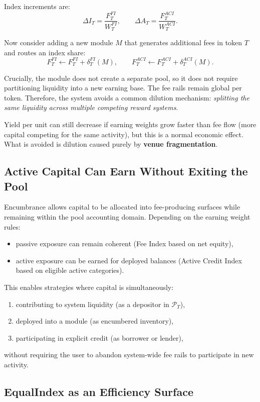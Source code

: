 \documentclass[version=preprint]{iacrcc}
\begin{document}
Index increments are:
\[
\Delta I_T = \frac{F^{FI}_T}{W^{FI}_T},
\qquad
\Delta A_T = \frac{F^{ACI}_T}{W^{ACI}_T}.
\]

Now consider adding a new module $M$ that generates additional fees in token $T$ and routes an index share:
\[
F^{FI}_T \leftarrow F^{FI}_T + \delta^{FI}_T(M),
\qquad
F^{ACI}_T \leftarrow F^{ACI}_T + \delta^{ACI}_T(M).
\]

Crucially, the module does not create a separate pool, so it does not require partitioning liquidity into a new earning base. The fee rails remain global per token. Therefore, the system avoids a common dilution mechanism: \textit{splitting the same liquidity across multiple competing reward systems}.

Yield per unit can still decrease if earning weights grow faster than fee flow (more capital competing for the same activity), but this is a normal economic effect. What is avoided is dilution caused purely by \textbf{venue fragmentation}.

\subsection{Active Capital Can Earn Without Exiting the Pool}

Encumbrance allows capital to be allocated into fee-producing surfaces while remaining within the pool accounting domain. Depending on the earning weight rules:
\begin{itemize}
  \item passive exposure can remain coherent (Fee Index based on net equity),
  \item active exposure can be earned for deployed balances (Active Credit Index based on eligible active categories).
\end{itemize}

This enables strategies where capital is simultaneously:
\begin{enumerate}
  \item contributing to system liquidity (as a depositor in $\mathcal{P}_T$),
  \item deployed into a module (as encumbered inventory),
  \item participating in explicit credit (as borrower or lender),
\end{enumerate}
without requiring the user to abandon system-wide fee rails to participate in new activity.

\subsection{EqualIndex as an Efficiency Surface}
\end{document}
